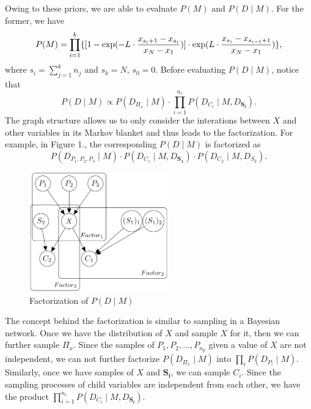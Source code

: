 Owing to these priors, we are able to evaluate $P(M)$ and $P(D \mid M)$. For the former, we have
\begin{equation}
P(M) = \prod_{i=1}^k \{ [1 - {\exp(- L \cdot {{x_{s_i+1} - x_{s_i}}\over{x_N - x_1}})}] \cdot \exp(L \cdot {{x_{s_{i}} - x_{s_{i-1} + 1}}\over{x_N - x_1}}) \},
\end{equation}
where $s_i = \sum_{j=1}^k n_j$ and $s_k = N$, $s_0 = 0$. Before evaluating $P(D \mid M)$, notice that
\begin{equation}
P(D \mid M) \propto P(D_{\Pi_x} \mid M) \cdot \prod_{i = 1}^{n_c} P(D_{C_i} \mid M, D_{\boldsymbol{S_i}}).
\end{equation}
The graph structure allows us to only consider the interations between $X$ and other variables in its Markov blanket and thus leads to the factorization. For example, in Figure 1., the corresponding $P(D \mid M)$ is factorized as
\begin{equation}
P(D_{ P_1,P_2,P_3 } \mid M) \cdot P( D_{ C_1 } \mid M,D_{\boldsymbol{S_1}}) \cdot P(D_{C_2} \mid M,D_{ S_2  }).
\end{equation} 

\begin{figure}
  \includegraphics[width=6cm]{graph1.eps}
\caption{Factorization of $P(D \mid M)$}
\label{fig:1}       %
\end{figure}

The concept behind the factorization is similar to sampling in a Bayesian network. Once we have the distribution of $X$ and sample $X$ for it, then we can further sample $\Pi_x$. Since the samples of $P_1,P_2,\ldots,P_{n_p}$ given a value of $X$ are not independent, we can not further factorize $P(D_{\Pi_x} \mid M)$ into $\prod_i P(D_{P_i} \mid M)$. Similarly, once we have samples of $X$ and $\boldsymbol{S_i}$, we can sample $C_i$. Since the sampling processes of child variables are independent from each other, we have the product $\prod_{i = 1}^{n_c} P(D_{C_i} \mid M, D_{\boldsymbol{S_i}})$.\\

